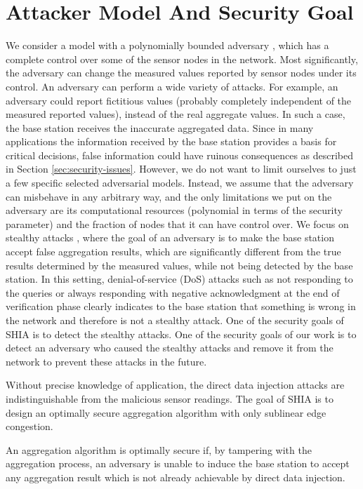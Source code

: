 \section{Attacker Model And Security Goal}
	We consider a model with a polynomially bounded adversary \cite{przydatek2003sia}, which has a complete control over some of the sensor nodes in the network.
	Most significantly, the adversary can change the measured values reported by sensor nodes under its control.
	An adversary can perform a wide variety of attacks.
	For example, an adversary could report fictitious values (probably completely independent of the measured reported values), instead of the real aggregate values.
	In such a case, the base station receives the inaccurate aggregated data. 
	Since in many applications the information received by the base station provides a basis for critical decisions, false information could have ruinous consequences as described in Section \ref{sec:security-issues}.
	However, we do not want to limit ourselves to just a few specific selected adversarial models. 
	Instead, we assume that the adversary can misbehave in any arbitrary way, and the only limitations we put on the adversary are its computational resources (polynomial in terms of the security parameter) and the fraction of nodes that it can have control over. 
	We focus on stealthy attacks \cite{przydatek2003sia}, where the goal of an adversary is to make the base station accept false aggregation results, which are significantly different from the true results determined by the measured values, while not being detected by the base station.
	In this setting, denial-of-service (DoS) attacks such as not responding to the queries or always responding with negative acknowledgment at the end of verification phase clearly indicates to the base station that something is wrong in the network and therefore is not a stealthy attack.
	One of the security goals of SHIA is to detect the stealthy attacks.
	One of the security goals of our work is to detect an adversary who caused the stealthy attacks and remove it from the network to prevent these attacks in the future.
	
	Without precise knowledge of application, the direct data injection attacks are indistinguishable from the malicious sensor readings.
	The goal of SHIA is to design an optimally secure aggregation algorithm with only sublinear edge congestion.
	\begin{definition}
		\label{def:optimally-secure}
		\cite{chan2006secure} An aggregation algorithm is optimally secure if, by tampering with the aggregation process, an adversary is unable to induce the base station to accept any aggregation result which is not already achievable by direct data injection.
	\end{definition}

